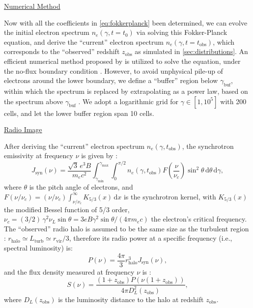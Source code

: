 \documentclass[modern]{aastex61}
\newcommand{\R}[1]{\mathrm{#1}}
\newcommand{\D}[1]{\R{d} #1}
\begin{document}
\vspace{1ex}
\uline{Numerical Method}

Now with all the coefficients in \autoref{eq:fokkerplanck} been determined,
we can evolve the initial electron spectrum $n_e(\gamma, t=t_0)$ via
solving this Fokker-Planck equation, and derive the \enquote{current}
electron spectrum $n_e(\gamma, t=t_{\R{obs}})$, which corresponds to the
\enquote{observed} redshift $z_{\R{obs}}$ as simulated in \autoref{sec:distributions}.
An efficient numerical method proposed by \citet{chang1970} is utilized
to solve the equation, under the no-flux boundary condition \citep{park1996}.
However, to avoid unphysical pile-up of electrons around the lower boundary,
we define a \enquote{buffer} region below $\gamma_{\R{buf}}$, within which
the spectrum is replaced by extrapolating as a power law, based on the
spectrum above $\gamma_{\R{buf}}$ \citep{donnert2014}.
We adopt a logarithmic grid for $\gamma \in [1, 10^5]$ with 200 cells,
and let the lower buffer region span 10 cells.

\vspace{1ex}
\uline{Radio Image}

After deriving the \enquote{current} electron spectrum
$n_e(\gamma, t_{\R{obs}})$, the synchrotron emissivity at frequency
$\nu$ is given by \citep{rybicki1979}:
\begin{equation}
  \label{sec:jnu-sync}
  J_{\R{syn}}(\nu) = \frac{\sqrt{3} \, e^3 B}{m_e c^2}
    \int_{\gamma_{\R{min}}}^{\gamma_{\R{max}}} \!\!\int_0^{\pi/2}
    n_e(\gamma, t_{\R{obs}}) F\!\left( \frac{\nu}{\nu_c} \right)
    \sin^2 \!\theta \,\D{\theta} \,\D{\gamma},
\end{equation}
where $\theta$ is the pitch angle of electrons,
and $F(\nu/\nu_c) = (\nu/\nu_c) \int_{\nu/\nu_c}^{\infty} K_{5/3}(x) \,\D{x}$
is the synchrotron kernel,
with $K_{5/3}(x)$ the modified Bessel function of 5/3 order,
$\nu_c = (3/2) \,\gamma^2 \nu_L \sin\theta
= 3 e B \gamma^2 \sin\theta / (4\pi m_e c)$
the electron's critical frequency.
The \enquote{observed} radio halo is assumed to be the same size as
the turbulent region \citep[e.g.,][]{vazza2011}:
$r_{\R{halo}} \simeq L_{\R{turb}} \simeq r_{\R{vir}}/3$,
therefore its radio power at a specific frequency (i.e., spectral luminosity) is:
\begin{equation}
  \label{eq:halo-power}
  P(\nu) = \frac{4\pi}{3} r_{\R{halo}}^3 J_{\R{syn}}(\nu),
\end{equation}
and the flux density measured at frequency $\nu$ is \citep[e.g.,][]{hogg1999}:
\begin{equation}
  \label{eq:halo-flux}
  S(\nu) = \frac{(1+z_{\R{obs}}) P(\nu(1+z_{\R{obs}}))}{4\pi D_L^2(z_{\R{obs}})},
\end{equation}
where $D_L(z_{\R{obs}})$ is the luminosity distance to the halo at
redshift $z_{\R{obs}}$.
\end{document}
